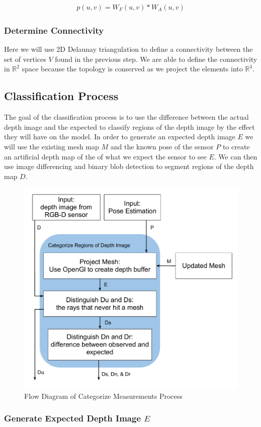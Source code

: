 \documentclass[12pt]{article}
\begin{document}
\begin{align}
p(u,v) = W_F(u,v)*W_A(u,v)
\label{eqn:vpr}
\end{align}

\subsubsection{Determine Connectivity}

Here we will use 2D Delaunay triangulation to define a connectivity
between the set of vertices $V$ found in the previous step. We are able
to define the connectivity in $\scriptstyle{\mathbb{R}}^2$ space because
the topology is conserved as we project the elements into
$\scriptstyle{\mathbb{R}}^3$.


\subsection{Classification Process}

The goal of the classification process is to use the difference between
the actual depth image and the expected to classify regions of the depth
image by the effect they will have on the model. In order to generate an
expected depth image $E$ we will use the existing mesh map $M$ and the
known pose of the sensor $P$ to create an artificial depth map of the of
what we expect the sensor to see $E$. We can then use image differencing
and binary blob detection to segment regions of the depth map $D$.  

\begin{figure}[h]
  \centering
    \includegraphics[height=0.5\textwidth]{SD_CM.pdf}
  \caption{Flow Diagram of Categorize Measurements Process}
  \label{fig:SD_CM}
\end{figure}

\subsubsection{Generate Expected Depth Image $E$}
\end{document}
